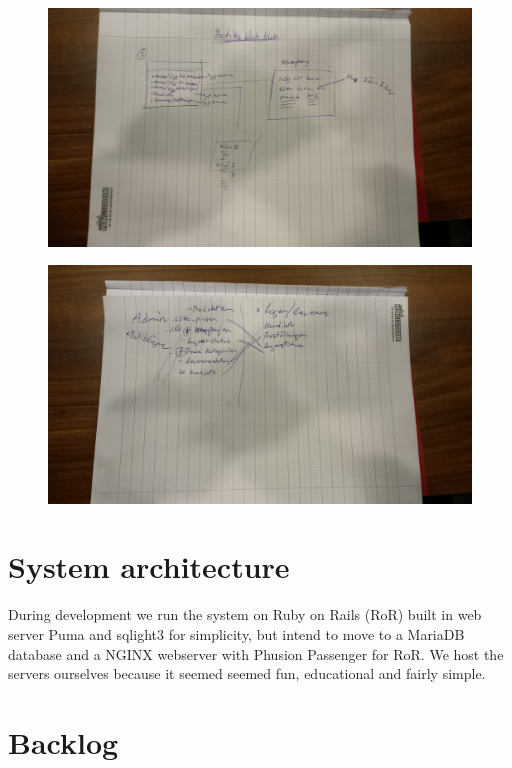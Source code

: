 \documentclass[paper=a4, fontsize=11pt]{report} %
\begin{document}
\begin{itemize}
	\begin{figure}
		\includegraphics[scale=0.12]{artifacts/ButiksAdmin.jpeg}
		\caption{}
		\label{fig:3}
	\end{figure}

	\begin{figure}
		\includegraphics[scale=0.12]{artifacts/Admin.jpeg}
		\caption{}
		\label{fig:4}
	\end{figure}

\section*{System architecture}
	During development we run the system on Ruby on Rails (RoR) built in web server
	Puma and sqlight3 for simplicity, but intend to move to a MariaDB database
	and a NGINX webserver with Phusion Passenger for RoR. We host
	the servers ourselves because it seemed seemed fun, educational and fairly simple.

\section*{Backlog}


\end{itemize}
\end{document}
